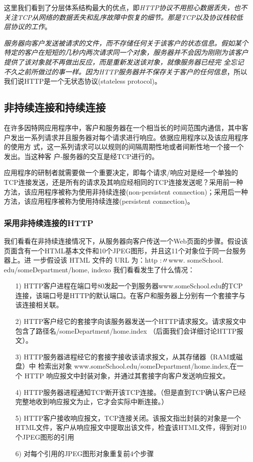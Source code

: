    这里我们看到了分层体系结构最大的优点，即\emph{HTTP协议不用担心数据丢失，也不关注TCP从网络的数据丢失和乱序故障中恢复的细节。那是TCP以及协议栈较低层协议的工作}。

    \emph{服务器向客户发送被请求的文件，而不存储任何关于该客户的状态信息。假如某个特定的客户在短短的几秒内两次请求同一个对象，服务器并不会因为刚刚为该客户提供了该对象就不再做出反应，而是重新发送该对象，就像服务器已经完 全忘记不久之前所做过的事一样。因为HTTP服务器并不保存关于客户的任何信息}，所以我们说HTTP是一个无状态协议(stateless protocol)。

\subsection{非持续连接和持续连接}

    在许多因特网应用程序中，客户和服务器在一个相当长的时间范围内通信，其中客户发出一系列请求并且服务器对每个请求进行响应。依据应用程序以及该应用程序的使用方 式，这一系列请求可以以规则的间隔周期性地或者间断性地一个接一个发出。当这种客 户-服务器的交互是经TCP进行的。

    应用程序的研制者就需要做一个重要决定，即每个请求/响应对是经一个单独的TCP连接发送，还是所有的请求及其响应经相同的TCP连接发送呢？采用前一种方法，该应用程序被称为使用非持续连接(non-persistent connection)；采用后一种方法，该应用程序被称为使用持续连接(persistent connection)。

\subsubsection{采用非持续连接的HTTP}

    我们看看在非持续连接情况下，从服务器向客户传送一个Web页面的步骤。假设该页面含有一个HTML基本文件和10个JPEG图形，并且这11个对象位于同一台服务器上。进 一步假设该 HTML 文件的 URL 为：http :〃www. someSchool. edu/someDepartment/home, indexo 我们看看发生了什么情况： 
    
\begin{itemize}
    \item [1)] HTTP客户进程在端口号80发起一个到服务器www.someSchool.edu的TCP连接，该端口号是HTTP的默认端口。在客户和服务器上分别有一个套接字与该连接相关联。
    \item [2)] HTTP客户经它的套接字向该服务器发送一个HTTP请求报文。请求报文中包含了路径名/someDepartment/home.index （后面我们会详细讨论HTTP报文）。 
    \item [3)] HTTP服务器进程经它的套接字接收该请求报文，从其存储器（RAM或磁盘）中 检索出对象 www.someSchool.edu/someDepartment/home.index,在一个 HTTP 响应报文中封装对象，并通过其套接字向客户发送响应报文。
    \item [4)] HTTP服务器进程通知TCP断开该TCP连接。（但是直到TCP确认客户已经完整地收到响应报文为止，它才会实际中断连接。）
    \item [5)] HTTP客户接收响应报文，TCP连接关闭。该报文指岀封装的对象是一个HTML文件，客户从响应报文中提取出该文件，检査该HTML文件，得到对10个JPEG图形的引用
    \item [6)] 对每个引用的JPEG图形对象重复前4个步骤
\end{itemize}

